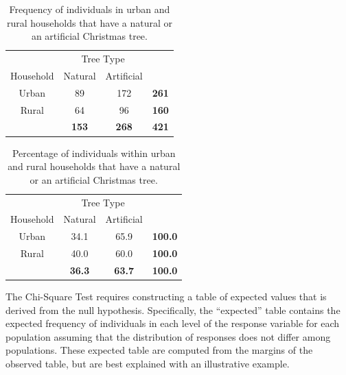 \documentclass[10pt,openany]{book}\usepackage[]{graphicx}\usepackage[]{color}
\begin{document}
\begin{table}[htbp]
  \centering
  \caption{Frequency of individuals in urban and rural households that have a natural or an artificial Christmas tree.}\label{tab:ChiTreeObs}
    \begin{tabular}{c|c|c|c|}
      \multicolumn{1}{c}{} & \multicolumn{2}{c}{Tree Type} & \multicolumn{1}{c}{} \\
      \cline{2-3}
      Household & Natural & Artificial & \multicolumn{1}{c}{} \\
      \hline
      \multicolumn{1}{|c|}{Urban} & 89 & 172 & \textbf{261} \\
      \hline
      \multicolumn{1}{|c|}{Rural} & 64 & 96 & \textbf{160} \\
      \hline
       & \textbf{153} & \textbf{268} & \textbf{421} \\
      \cline{2-4}
    \end{tabular}
\end{table}

\begin{table}[htbp]
  \centering
  \caption{Percentage of individuals within urban and rural households that have a natural or an artificial Christmas tree.}\label{tab:ChiTreeObsProp}
    \begin{tabular}{c|c|c|c|}
      \multicolumn{1}{c}{} & \multicolumn{2}{c}{Tree Type} & \multicolumn{1}{c}{} \\
      \cline{2-3}
      Household & Natural & Artificial & \multicolumn{1}{c}{} \\
      \hline
      \multicolumn{1}{|c|}{Urban} & 34.1 & 65.9 & \textbf{100.0} \\
      \hline
      \multicolumn{1}{|c|}{Rural} & 40.0 & 60.0 & \textbf{100.0} \\
      \hline
       & \textbf{36.3} & \textbf{63.7} & \textbf{100.0} \\
      \cline{2-4}
    \end{tabular}
\end{table}

The Chi-Square Test requires constructing a table of expected values that is derived from the null hypothesis. Specifically, the ``expected'' table contains the expected frequency of individuals in each level of the response variable for each population assuming that the distribution of responses does not differ among populations. These expected table are computed from the margins of the observed table, but are best explained with an illustrative example.
\end{document}
